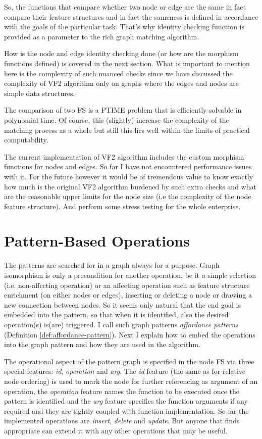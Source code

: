 So, the functions that compare whether two node or edge are the same in fact compare their feature structures and in fact the sameness is defined in accordance with the goals of the particular task. That's why identity checking function is provided as a parameter to the rich graph matching algorithm.

How is the node and edge identity checking done (or how are the morphism functions defined) is covered in the next section. What is important to mention here is the complexity of such nuanced checks since we have discussed the complexity of VF2 algorithm only on graphs where the edges and nodes are simple data structures. 

The comparison of two FS is a PTIME problem that is efficiently solvable in polynomial time. Of course, this (slightly) increase the complexity of the matching process as a whole but still this lies well within the limits of practical computability. 

The current implementation of VF2 algorithm includes the custom morphism functions for nodes and edges. So far I have not encountered performance issues with it. For the future however it would be of tremendous value to know exactly how much is the original VF2 algorithm burdened by such extra checks and what are the reasonable upper limits for the node size (i.e the complexity of the node feature structure). And perform some stress testing for the whole enterprise.  


\section{Pattern-Based Operations}
\label{sec:pattern-based-operations}
The patterns are searched for in a graph always for a purpose. Graph isomorphism is only a precondition for another operation, be it a simple selection (i.e. non-affecting operation) or an affecting operation such as feature structure enrichment (on either nodes or edges), inserting or deleting a node or drawing a new connection between nodes. So it seems only natural that the end goal is embedded into the pattern, so that when it is identified, also the desired operation(s) is(are) triggered. I call such graph patterns \textit{affordance patterns} (Definition \ref{def:affordance-pattern}). Next I explain how to embed the operations into the graph pattern and how they are used in the algorithm. 

The operational aspect of the pattern graph is specified in the node FS via three special features: \textit{id}, \textit{operation} and \textit{arg}. The \textit{id} feature (the same as for relative node ordering) is used to mark the node for further referencing as argument of an operation, the \textit{operation} feature names the function to be executed once the pattern is identified and the \textit{arg} feature specifies the function arguments if any required and they are tightly coupled with function implementation. So far the implemented operations are \textit{insert}, \textit{delete} and \textit{update}. But anyone that finds appropriate can extend it with any other operations that may be useful.

